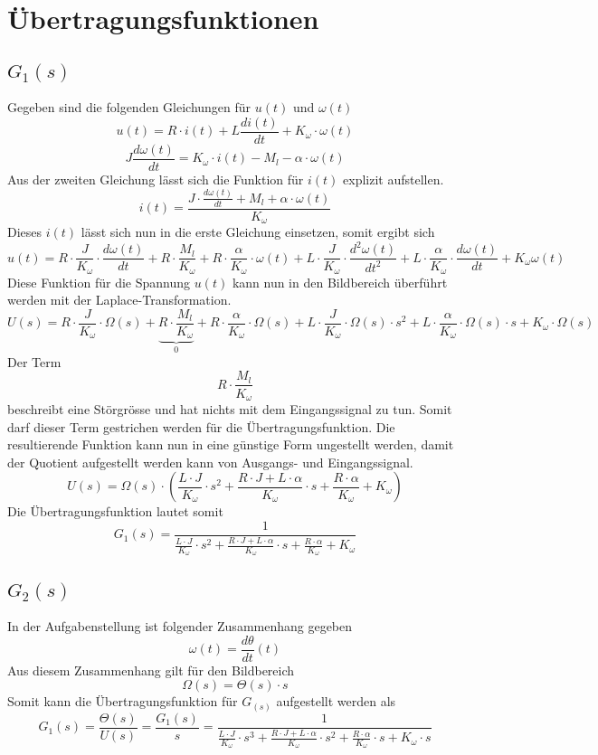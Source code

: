 \section{Übertragungsfunktionen}

\subsection{$G_1(s)$}
Gegeben sind die folgenden Gleichungen für $u(t)$ und $\omega(t)$
\[
	u(t) = R \cdot i(t) + L \frac{di(t)}{dt} + K_\omega \cdot \omega(t)
\]
\[
	J \frac{d\omega(t)}{dt}
	= K_\omega \cdot i(t) - M_l - \alpha \cdot \omega(t)
\]
Aus der zweiten Gleichung lässt sich die Funktion für $i(t)$ explizit
aufstellen.
\[
	i(t)
	= \frac{J \cdot \frac{d\omega(t)}{dt} + M_l
		+ \alpha \cdot \omega(t)}{K_\omega}
\]
Dieses $i(t)$ lässt sich nun in die erste Gleichung einsetzen, somit ergibt
sich
\[
	u(t)
	= R \cdot \frac{J}{K_\omega} \cdot \frac{d\omega(t)}{dt} 
		+ R \cdot \frac{M_l}{K_\omega}
		+ R \cdot \frac{\alpha}{K_\omega} \cdot \omega(t)
		+ L \cdot \frac{J}{K_\omega} \cdot \frac{d^2\omega(t)}{dt^2}
		+ L \cdot \frac{\alpha}{K_\omega} \cdot \frac{d\omega(t)}{dt}
		+ K_\omega \omega(t)
\]
Diese Funktion für die Spannung $u(t)$ kann nun in den Bildbereich überführt
werden mit der Laplace-Transformation.
\[
	U(s)
	= R \cdot \frac{J}{K_\omega} \cdot \Omega(s)
		+ \underbrace{R \cdot \frac{M_l}{K_\omega}}_{0}
		+ R \cdot \frac{\alpha}{K_\omega} \cdot \Omega(s)
		+ L \cdot \frac{J}{K_\omega} \cdot \Omega(s) \cdot s^2
		+ L \cdot \frac{\alpha}{K_\omega} \cdot \Omega(s) \cdot s
		+ K_\omega \cdot \Omega(s)
\]
Der Term
\[ R \cdot \frac{M_l}{K_\omega} \]
beschreibt eine Störgrösse und hat nichts mit dem Eingangssignal zu tun. Somit
darf dieser Term gestrichen werden für die Übertragungsfunktion. Die
resultierende Funktion kann nun in eine günstige Form ungestellt werden, damit
der Quotient aufgestellt werden kann von Ausgangs- und Eingangssignal.
\[
	U(s)
	= \Omega(s) \cdot \left(
		\frac{L \cdot J}{K_\omega} \cdot s^2
		+ \frac{R \cdot J + L \cdot \alpha}{K_\omega} \cdot s 
		+ \frac{R \cdot \alpha}{K_\omega}
		+ K_\omega
	\right)
\]
Die Übertragungsfunktion lautet somit
\[
	G_1(s)
	= \frac{1}{ \frac{L \cdot J}{K_\omega} \cdot s^2
		+ \frac{R \cdot J + L \cdot \alpha}{K_\omega} \cdot s
		+ \frac{R \cdot \alpha}{K_\omega}
		+ K_\omega
	}
\]

\subsection{$G_2(s)$}
In der Aufgabenstellung ist folgender Zusammenhang gegeben
\[
	\omega(t) = \frac{d\theta}{dt}(t)
\]
Aus diesem Zusammenhang gilt für den Bildbereich
\[
	\Omega(s) = \Theta(s) \cdot s
\]
Somit kann die Übertragungsfunktion für $G_(s)$ aufgestellt werden als
\[
	G_1(s)
	= \frac{\Theta(s)}{U(s)} = \frac{G_1(s)}{s}
	= \frac{1}{ \frac{L \cdot J}{K_\omega} \cdot s^3
		+ \frac{R \cdot J + L \cdot \alpha}{K_\omega} \cdot s^2
		+ \frac{R \cdot \alpha}{K_\omega} \cdot s
		+ K_\omega \cdot s
	}
\]
